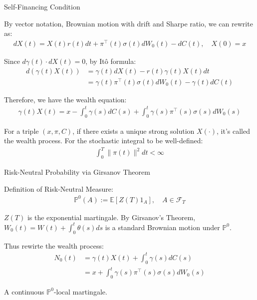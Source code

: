 \documentclass{beamer}
\begin{document}
\begin{frame}{Self-Financing Condition}

    {\footnotesize \footnotesize
    \par By vector notation, Brownian motion with drift and Sharpe ratio, we can rewrite as:
    \begin{align*}
        dX(t) = X(t)r(t)dt + \pi^\top(t)\sigma(t)dW_0(t) - dC(t), \quad X(0) = x
    \end{align*}
    \par Since $d\gamma(t) \cdot dX(t) = 0$, by Itô formula:
    \begin{align*}
        d(\gamma(t)X(t)) &= \gamma(t)dX(t) - r(t)\gamma(t)X(t)dt \\
        &= \gamma(t)\pi^\top(t)\sigma(t)dW_0(t) - \gamma(t)dC(t)
    \end{align*}
    \par  \pause Therefore, we have the wealth equation:
    \begin{align*}
        \gamma(t)X(t) = x - \int_0^t \gamma(s)dC(s) + \int_0^t \gamma(s)\pi^\top(s)\sigma(s)dW_0(s)
    \end{align*}
    \par For a triple $(x, \pi, C)$, if there exists a unique strong solution $X(\cdot)$, it's called the wealth process.
    For the stochastic integral to be well-defined:
    \begin{align*}
        \int_{0}^{T} \|\pi(t)\|^{2}  dt < \infty
    \end{align*}
    }   
\end{frame} 

\begin{frame}{Risk-Neutral Probability via Girsanov Theorem}

    {\footnotesize \footnotesize
    \par Definition of Risk-Neutral Measure:
    \begin{align*}
         \mathbb{P}^{0}(A) := \mathbb{E}[Z(T)1_{A}], \quad A \in \mathcal{F}_{T}
    \end{align*}
    \par $Z(T)$ is the exponential martingale. By Girsanov's Theorem, $ W_{0}(t) = W(t) + \int_{0}^{t} \theta(s) ds$ 
    is a standard Brownian motion under $\mathbb{P}^{0}$.
    \par  \pause Thus rewirte the wealth process:
    \begin{align*}
         N_{0}(t) &= \gamma(t)X(t) + \int_{0}^{t} \gamma(s)dC(s) \\
    &= x + \int_{0}^{t} \gamma(s)\pi^{\top}(s)\sigma(s) dW_{0}(s)
    \end{align*}
    \par A continuous $\mathbb{P}^{0}$-local martingale.
    }   
\end{frame} 
\end{document}
